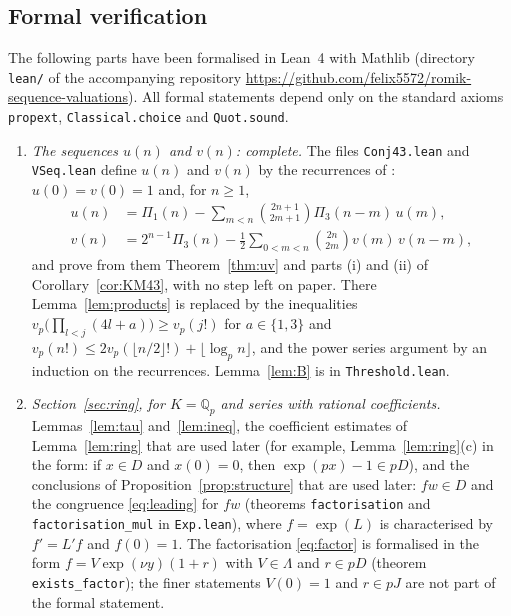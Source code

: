 \documentclass[11pt]{amsart}
\theoremstyle{definition}
\theoremstyle{remark}
\newcommand{\Q}{\mathbb{Q}}
\begin{document}
\subsection{Formal verification} The following parts have been formalised in Lean~4
\cite{Lean4} with Mathlib \cite{Mathlib} (directory \texttt{lean/} of the accompanying repository
\url{https://github.com/felix5572/romik-sequence-valuations}). All
formal statements depend only on the standard axioms \texttt{propext}, \texttt{Classical.choice}
and \texttt{Quot.sound}.

\begin{enumerate}
\item[(1)] \emph{The sequences $u(n)$ and $v(n)$: complete.} The files \texttt{Conj43.lean} and
\texttt{VSeq.lean} define $u(n)$ and $v(n)$ by the recurrences of \cite[\S2]{KM}: $u(0)=v(0)=1$
and, for $n\ge1$,
\begin{align*}
u(n)&=\Pi_1(n)-\sum_{m<n}\binom{2n+1}{2m+1}\Pi_3(n-m)\,u(m),\\
v(n)&=2^{n-1}\Pi_3(n)-\frac12\sum_{0<m<n}\binom{2n}{2m}v(m)\,v(n-m),
\end{align*}
and prove from them Theorem~\ref{thm:uv} and parts (i) and (ii) of Corollary~\ref{cor:KM43}, with
no step left on paper. There Lemma~\ref{lem:products} is replaced by the inequalities
$v_p\bigl(\prod_{l<j}(4l+a)\bigr)\ge v_p(j!)$ for $a\in\{1,3\}$ and
$v_p(n!)\le2v_p(\lfloor n/2\rfloor!)+\lfloor\log_pn\rfloor$, and the power series argument by an
induction on the recurrences. Lemma~\ref{lem:B} is in \texttt{Threshold.lean}.

\item[(2)] \emph{Section~\ref{sec:ring}, for $K=\Q_p$ and series with rational coefficients.}
Lemmas~\ref{lem:tau} and~\ref{lem:ineq}, the coefficient estimates of Lemma~\ref{lem:ring} that
are used later (for example, Lemma~\ref{lem:ring}(c) in the form: if $x\in D$ and $x(0)=0$, then
$\exp(px)-1\in pD$), and the conclusions of Proposition~\ref{prop:structure} that are used later: $fw\in D$ and the congruence
\eqref{eq:leading} for $fw$ (theorems \texttt{factorisation} and \texttt{factorisation\_mul} in
\texttt{Exp.lean}), where $f=\exp(L)$ is characterised by $f'=L'f$ and $f(0)=1$. The factorisation
\eqref{eq:factor} is formalised in the form $f=V\exp(\nu y)(1+r)$ with $V\in\Lambda$ and $r\in pD$
(theorem \texttt{exists\_factor}); the finer statements $V(0)=1$ and $r\in pJ$ are not part of
the formal statement.


\end{enumerate}
\end{document}
